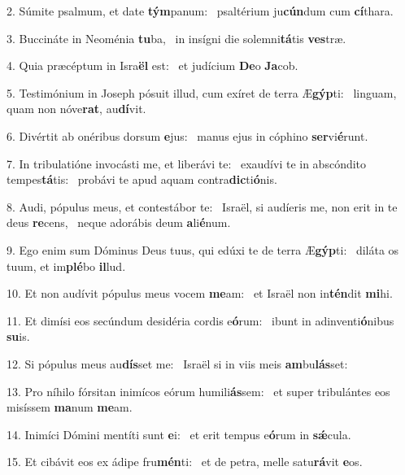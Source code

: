 2. Súmite psalmum, et date \textbf{tým}panum: \ast\  psaltérium ju\textbf{cún}dum cum \textbf{cí}thara.\

3. Buccináte in Neoménia \textbf{tu}ba, \ast\  in insígni die solemni\textbf{tá}tis \textbf{ves}træ.\

4. Quia præcéptum in Isra\textbf{ël} est: \ast\  et judícium \textbf{De}o \textbf{Ja}cob.\

5. Testimónium in Joseph pósuit illud, cum exíret de terra Æ\textbf{gýp}ti: \ast\  linguam, quam non nóve\textbf{rat}, au\textbf{dí}vit.\

6. Divértit ab onéribus dorsum \textbf{e}jus: \ast\  manus ejus in cóphino \textbf{ser}vi\textbf{é}runt.\

7. In tribulatióne invocásti me, et liberávi te: \dag\  exaudívi te in abscóndito tempes\textbf{tá}tis: \ast\  probávi te apud aquam contra\textbf{dic}ti\textbf{ó}nis.\

8. Audi, pópulus meus, et contestábor te: \dag\  Israël, si audíeris me, non erit in te deus \textbf{re}cens, \ast\  neque adorábis deum \textbf{a}li\textbf{é}num.\

9. Ego enim sum Dóminus Deus tuus, qui edúxi te de terra Æ\textbf{gýp}ti: \ast\  diláta os tuum, et im\textbf{plé}bo \textbf{il}lud.\

10. Et non audívit pópulus meus vocem \textbf{me}am: \ast\  et Israël non in\textbf{tén}dit \textbf{mi}hi.\

11. Et dimísi eos secúndum desidéria cordis e\textbf{ó}rum: \ast\  ibunt in adinventi\textbf{ó}nibus \textbf{su}is.\

12. Si pópulus meus au\textbf{dís}set me: \ast\  Israël si in viis meis \textbf{am}bu\textbf{lás}set:\

13. Pro níhilo fórsitan inimícos eórum humili\textbf{ás}sem: \ast\  et super tribulántes eos misíssem \textbf{ma}num \textbf{me}am.\

14. Inimíci Dómini mentíti sunt \textbf{e}i: \ast\  et erit tempus e\textbf{ó}rum in \textbf{sǽ}cula.\

15. Et cibávit eos ex ádipe fru\textbf{mén}ti: \ast\  et de petra, melle satu\textbf{rá}vit \textbf{e}os.\

